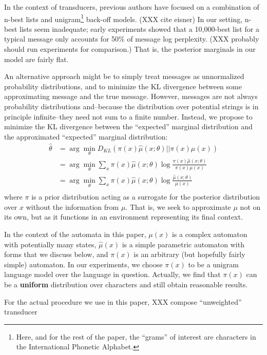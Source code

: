 \documentclass[11pt,a4paper]{article}
\begin{document}
In the context of transducers, previous authors have focused on a
combination of n-best lists and unigram\footnote{Here, and for the
rest of the paper, the ``grams'' of interest are characters in the
International Phonetic Alphabet.} back-off models. (XXX cite eisner)
In our setting, n-best lists seem inadequate; early experiments
showed that a 10,000-best list for a typical message only accounts
for 50\% of message log perplexity. (XXX probably should run
experiments for comparison.) That is, the posterior marginals in
our model are fairly flat.

An alternative approach might be to simply treat messages as
unnormalized probability distributions, and to minimize the KL
divergence between some approximating message and the true message.
However, messages are not always probability distributions and--because
the distribution over potential strings is in principle infinite--they
need not sum to a finite number. Instead, we propose to minimize
the KL divergence between the ``expected'' marginal distribution
and the approximated ``expected'' marginal distribution:
\begin{equation}
  \begin{split}
    \hat\theta &= \arg\!\min_{\theta} D_{KL}(\pi(x)\hat\mu(x;\theta)||\pi(x)\mu(x) ) \\
    &= \arg\!\min_{\theta} \sum_x \pi(x) \hat\mu(x;\theta) \log \frac{\pi(x)\hat\mu(x;\theta)}{\pi(x)\mu(x)} \\
    &= \arg\!\min_{\theta} \sum_x \pi(x) \hat\mu(x;\theta) \log \frac{\hat\mu(x;\theta)}{\mu(x)} \\
   \end{split}
 \end{equation}
where $\pi$ is a prior distribution acting as a surrogate for the posterior
distribution over $x$ without the information from $\mu$. That is, we 
seek to approximate $\mu$ not on its own, but as it functions in
an environment representing its final context. 

In the context of the automata in this paper, $\mu(x)$ is a complex
automaton with potentially many states, $\hat\mu(x)$ is a simple
parametric automaton with forms that we discuss below, and $\pi(x)$
is an arbitrary (but hopefully fairly simple) automaton. In our
experiments, we choose $\pi(x)$ to be a unigram language model over
the language in question.  Actually, we find that $\pi(x)$ can be
a \textbf{uniform} distribution over characters and still obtain
reasonable results.

For the actual procedure we use in this paper, XXX compose ``unweighted''
transducer
\end{document}
